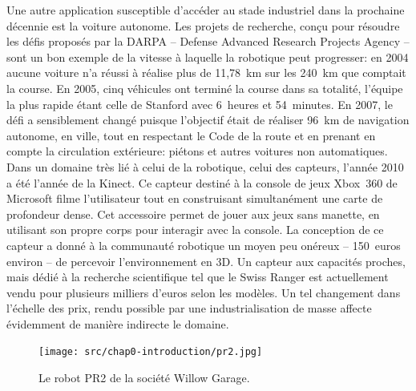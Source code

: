 Une autre application susceptible d'accéder au stade industriel dans
la prochaine décennie est la voiture autonome. Les projets de
recherche, conçu pour résoudre les défis proposés par la DARPA --
Defense Advanced Research Projects Agency -- sont un bon exemple de la
vitesse à laquelle la robotique peut progresser: en 2004 aucune
voiture n'a réussi à réalise plus de 11,78 km sur les 240 km que
comptait la course. En 2005, cinq véhicules ont terminé la course dans
sa totalité, l'équipe la plus rapide étant celle de Stanford avec
6 heures et 54 minutes. En 2007, le défi a sensiblement changé puisque
l'objectif était de réaliser 96 km de navigation autonome, en ville,
tout en respectant le Code de la route et en prenant en compte la
circulation extérieure: piétons et autres voitures non
automatiques. Dans un domaine très lié à celui de la robotique, celui
des capteurs, l'année 2010 a été l'année de la Kinect. Ce capteur destiné à la console de jeux Xbox 360 de
Microsoft filme l'utilisateur tout en construisant simultanément une
carte de profondeur dense. Cet accessoire permet de jouer aux jeux
sans manette, en utilisant son propre corps pour interagir avec la
console. La conception de ce capteur a donné à la communauté robotique
un moyen peu onéreux -- 150 euros environ -- de percevoir
l'environnement en 3D. Un capteur aux capacités proches, mais dédié à
la recherche scientifique tel que le Swiss Ranger
est actuellement vendu pour plusieurs milliers d'euros selon les
modèles. Un tel changement dans l'échelle des prix, rendu possible par
une industrialisation de masse affecte évidemment de manière indirecte
le domaine.


\begin{figure}
  \begin{center}
    \texttt{[image: src/chap0-introduction/pr2.jpg]}
  \end{center}
  \caption{Le robot PR2 de la société Willow Garage. \label{fig:pr2}}
\end{figure}



